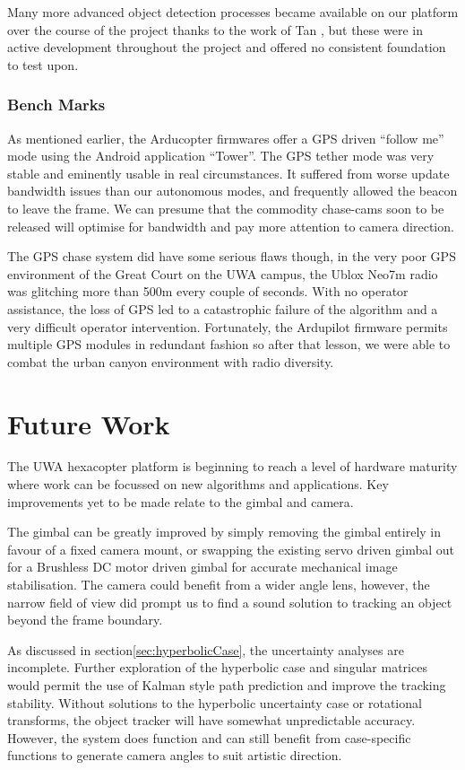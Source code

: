 \documentclass[a4paper, 11pt, titlepage]{article}
\begin{document}
      Many more advanced object detection processes became available on our platform over the course of the project thanks to the work of Tan \cite{Tan}, but these were in active development throughout the project and offered no consistent foundation to test upon.

    \subsubsection{Bench Marks}
      As mentioned earlier, the Arducopter firmwares offer a GPS driven ``follow me'' mode using the Android application ``Tower''. %
      The GPS tether mode was very stable and eminently usable in real circumstances.  It suffered from worse update bandwidth issues than our autonomous modes, and frequently allowed the beacon to leave the frame.  We can presume that the commodity chase-cams soon to be released will optimise for bandwidth and pay more attention to camera direction.

      The GPS chase system did have some serious flaws though, in the very poor GPS environment of the Great Court on the UWA campus, the Ublox Neo7m radio was glitching more than 500m every couple of seconds.  With no operator assistance, the loss of GPS led to a catastrophic failure of the algorithm and a very difficult operator intervention.  Fortunately, the Ardupilot firmware permits multiple GPS modules in redundant fashion so after that lesson, we were able to combat the urban canyon environment with radio diversity.

\section{Future Work}

  The UWA hexacopter platform is beginning to reach a level of hardware maturity where work can be focussed on new algorithms and applications.  Key improvements yet to be made relate to the gimbal and camera.

  The gimbal can be greatly improved by simply removing the gimbal entirely in favour of a fixed camera mount, or swapping the existing servo driven gimbal out for a Brushless DC motor driven gimbal for accurate mechanical image stabilisation.  The camera could benefit from a wider angle lens, however, the narrow field of view did prompt us to find a sound solution to tracking an object beyond the frame boundary.

  As discussed in section\ref{sec:hyperbolicCase}, the uncertainty analyses are incomplete.  Further exploration of the hyperbolic case and singular matrices would permit the use of Kalman style path prediction and improve the tracking stability.
  Without solutions to the hyperbolic uncertainty case or rotational transforms, the object tracker will have somewhat unpredictable accuracy.  However, the system does function and can still benefit from case-specific functions to generate camera angles to suit artistic direction.
\end{document}
